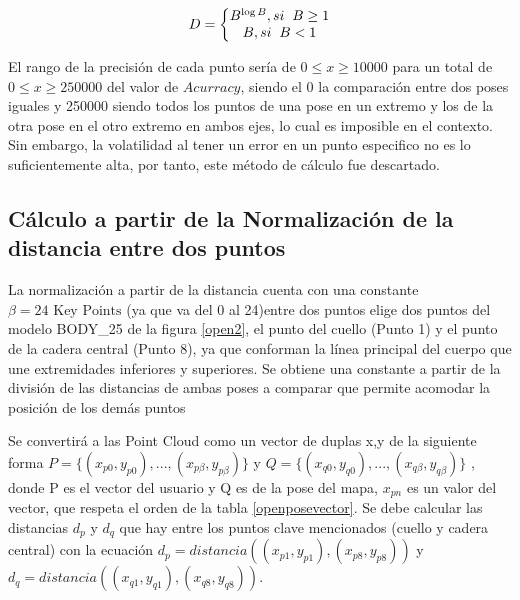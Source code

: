 \begin{equation}
D=\left\{\begin{matrix}
B^{\log B} , si \hspace{2mm} B \geq 1  \\
B , si \hspace{2mm} B <  1
\end{matrix}\right.
\label{equation18.2}
\end{equation}

El rango de la precisión de cada punto sería de $0 \leq x \geq 10000$ para un total de $0 \leq x \geq 250000$ del valor de $Acurracy$, siendo el 0 la comparación entre dos poses iguales y 250000 siendo todos los puntos de una pose en un extremo y los de la otra pose en el otro extremo en ambos ejes, lo cual es imposible en el contexto. Sin embargo, la volatilidad al tener un error en un punto especifico no es lo suficientemente alta, por tanto, este método de cálculo fue descartado.

 
\subsection{Cálculo a partir de la Normalización de la distancia entre dos puntos}

La normalización a partir de la distancia cuenta con una constante $\beta = 24\text{ Key Points}$ (ya que va del 0 al 24)entre dos puntos elige dos puntos del modelo BODY\_25 de la figura \ref{open2}, el punto del cuello (Punto 1) y el punto de la cadera central (Punto 8), ya que conforman la línea principal del cuerpo que une extremidades inferiores y superiores. Se obtiene una constante a partir de la división de las distancias de ambas poses a comparar que permite acomodar la posición de los demás puntos 

Se convertirá a las Point Cloud como un vector de duplas x,y de la siguiente forma $P=\{(x_{p0},y_{p0}),...,(x_{p\beta},y_{p\beta})\}$ y $Q=\{(x_{q0},y_{q0}),...,(x_{q\beta},y_{q\beta})\}$
, donde P es el vector del usuario y Q es de la pose del mapa, $x_{pn}$ es un valor del vector, que respeta el  orden de la tabla \ref{openposevector}. Se debe calcular las distancias $d_p$ y $d_q$ que hay entre los puntos clave mencionados (cuello y cadera central) con la ecuación $d_p= distancia((x_{p1},y_{p1}),(x_{p8},y_{p8}))$ y $d_q= distancia((x_{q1},y_{q1}),(x_{q8},y_{q8}))$.

